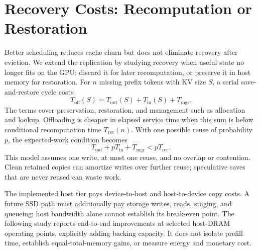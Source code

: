 \section{Recovery Costs: Recomputation or Restoration}
\label{sec:tradeoff}

Better scheduling reduces cache churn but does not eliminate recovery after eviction.
We extend the replication by studying recovery when useful state no longer fits on the GPU: discard it for later recomputation, or preserve it in host memory for restoration.
For $n$ missing prefix tokens with KV size $S$, a serial save-and-restore cycle costs
\begin{equation}
 T_{\mathrm{off}}(S)=T_{\mathrm{out}}(S)+T_{\mathrm{in}}(S)+T_{\mathrm{mgr}}.
 \label{eq:offload-cost}
\end{equation}
The terms cover preservation, restoration, and management such as allocation and lookup.
Offloading is cheaper in elapsed service time when this sum is below conditional recomputation time $T_{\mathrm{rec}}(n)$.
With one possible reuse of probability $p$, the expected-work condition becomes
\begin{equation}
 T_{\mathrm{out}}+pT_{\mathrm{in}}+T_{\mathrm{mgr}}<pT_{\mathrm{rec}}.
 \label{eq:expected-offload-cost}
\end{equation}
This model assumes one write, at most one reuse, and no overlap or contention.
Clean retained copies can amortize writes over further reuse; speculative saves that are never reused can waste work.

The implemented host tier pays device-to-host and host-to-device copy costs.
A future SSD path must additionally pay storage writes, reads, staging, and queueing; host bandwidth alone cannot establish its break-even point.
The following study reports end-to-end improvements at selected host-DRAM operating points, explicitly adding backing capacity.
It does not isolate prefill time, establish equal-total-memory gains, or measure energy and monetary cost.
